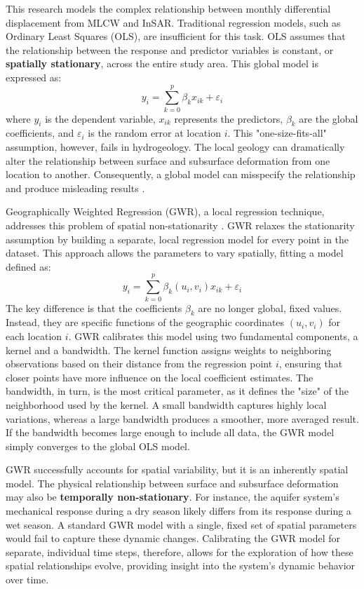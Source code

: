 This research models the complex relationship between monthly differential displacement from MLCW and InSAR. Traditional regression models, such as Ordinary Least Squares (OLS), are insufficient for this task. OLS assumes that the relationship between the response and predictor variables is constant, or \textbf{spatially stationary}, across the entire study area. This global model is expressed as:
%
\begin{equation}
	y_i = \sum_{k=0}^{p} \beta_k x_{ik} + \varepsilon_i
	\label{eq:ols}
\end{equation}
%
\noindent where \(y_i\) is the dependent variable, \(x_{ik}\) represents the predictors, \(\beta_k\) are the global coefficients, and \(\varepsilon_i\) is the random error at location \(i\). This "one-size-fits-all" assumption, however, fails in hydrogeology. The local geology can dramatically alter the relationship between surface and subsurface deformation from one location to another. Consequently, a global model can misspecify the relationship and produce misleading results \citep{mgwr_book_2017}.

Geographically Weighted Regression (GWR), a local regression technique, addresses this problem of spatial non-stationarity \citep{brunsdon1996, fotheringham2002geographically}. GWR relaxes the stationarity assumption by building a separate, local regression model for every point in the dataset. This approach allows the parameters to vary spatially, fitting a model defined as:
%
\begin{equation}
	y_i = \sum_{k=0}^{p} \beta_k(u_i, v_i) x_{ik} + \varepsilon_i
	\label{eq:gwr}
\end{equation}
%
\noindent The key difference is that the coefficients \(\beta_k\) are no longer global, fixed values. Instead, they are specific functions of the geographic coordinates \((u_i, v_i)\) for each location \(i\). GWR calibrates this model using two fundamental components, a kernel and a bandwidth. The kernel function assigns weights to neighboring observations based on their distance from the regression point \(i\), ensuring that closer points have more influence on the local coefficient estimates. The bandwidth, in turn, is the most critical parameter, as it defines the "size" of the neighborhood used by the kernel. A small bandwidth captures highly local variations, whereas a large bandwidth produces a smoother, more averaged result. If the bandwidth becomes large enough to include all data, the GWR model simply converges to the global OLS model.

GWR successfully accounts for spatial variability, but it is an inherently spatial model. The physical relationship between surface and subsurface deformation may also be \textbf{temporally non-stationary}. For instance, the aquifer system's mechanical response during a dry season likely differs from its response during a wet season. A standard GWR model with a single, fixed set of spatial parameters would fail to capture these dynamic changes. Calibrating the GWR model for separate, individual time steps, therefore, allows for the exploration of how these spatial relationships evolve, providing insight into the system's dynamic behavior over time.